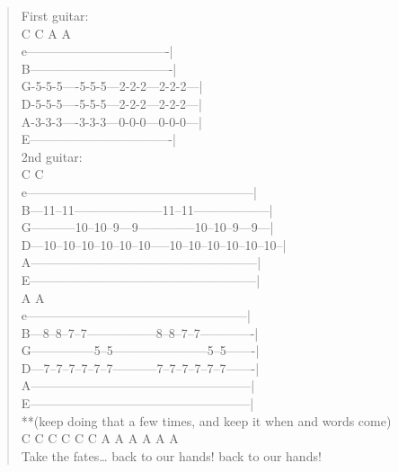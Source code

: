 \documentclass[11pt]{article}
\begin{document}
\begin{verse}
\vspace*{1em}
First guitar:\\
\hspace*{1em}C         C       A       A\\
e----------------------------------|\\
B----------------------------------|\\
G-5-5-5----5-5-5---2-2-2---2-2-2---|\\
D-5-5-5----5-5-5---2-2-2---2-2-2---|\\
A-3-3-3----3-3-3---0-0-0---0-0-0---|\\
E----------------------------------|\\
\vspace*{1em}
2nd guitar:\\
\hspace*{2em}C                           C\\
e------------------------------------------------------|\\
B---11--11---------------------11--11------------------|\\
G-----------10--10--9---9--------------10--10--9---9---|\\
D---10--10--10--10--10--10-----10--10--10--10--10--10--|\\
A------------------------------------------------------|\\
E------------------------------------------------------|\\
\hspace*{2em}A                            A\\
e-----------------------------------------------------|\\
B---8--8--7--7-----------------8--8--7--7-------------|\\
G---------------5--5-----------------------5--5-------|\\
D---7--7--7--7--7--7-----------7--7--7--7--7--7-------|\\
A-----------------------------------------------------|\\
E-----------------------------------------------------|\\
\vspace*{1em}
**(keep doing that a few times, and keep it when and words come)\\
\vspace*{1em}
C C C     C C  C   A A A             A A A\\
Take the fates\ldots{} back to our hands! back to our hands!\\

\end{verse}
\end{document}
